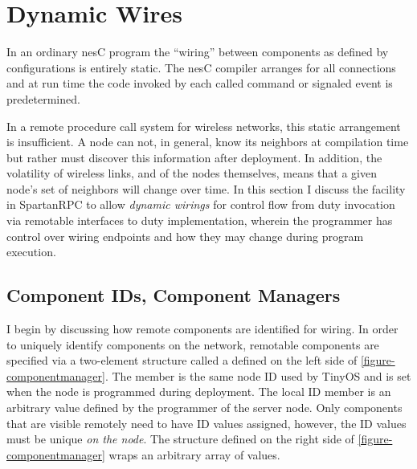 \section{Dynamic Wires}
\label{section-dynamic-wires}

In an ordinary nesC program the ``wiring'' between components as defined by configurations is
entirely static. The nesC compiler arranges for all connections and at run time the code invoked
by each called command or signaled event is predetermined.

In a remote procedure call system for wireless networks, this static arrangement is
insufficient. A node can not, in general, know its neighbors at compilation time but rather must
discover this information after deployment. In addition, the volatility of wireless links, and
of the nodes themselves, means that a given node's set of neighbors will change over time. In
this section I discuss the facility in SpartanRPC to allow \emph{dynamic wirings} for control
flow from duty invocation via remotable interfaces to duty implementation, wherein the
programmer has control over wiring endpoints and how they may change during program execution.

\subsection{Component IDs, Component Managers}
\label{section-componentmanager}

I begin by discussing how remote components are identified for wiring. In order to uniquely
identify components on the network, remotable components are specified via a two-element
structure called a  defined on the left side of
\autoref{figure-componentmanager}. The  member is the same node ID used by TinyOS
and is set when the node is programmed during deployment. The local ID member is an arbitrary
value defined by the programmer of the server node. Only components that are visible remotely
need to have ID values assigned, however, the ID values must be unique \emph{on the node}. The
 structure defined on the right side of \autoref{figure-componentmanager}
wraps an arbitrary array of  values.
 
